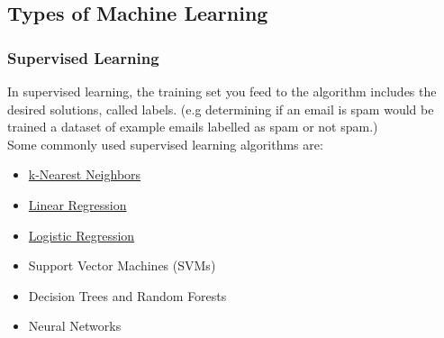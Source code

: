 \documentclass[12pt]{article}
\begin{document}
    \subsection{Types of Machine Learning}
        \subsubsection{Supervised Learning}
            In supervised learning, the training set you feed to the algorithm includes the desired solutions, called
            labels. (e.g determining if an email is spam would be trained a dataset of example emails labelled as spam or
            not spam.) \\[0.1in] 
            Some commonly used supervised learning algorithms are:
            \begin{itemize}
                \item \hyperref[sec:KNN]{k-Nearest Neighbors}
                \item \hyperref[sec:LinearRegression]{Linear Regression}
                \item \hyperref[sec:LogisticRegression]{Logistic Regression}
                \item Support Vector Machines (SVMs)
                \item Decision Trees and Random Forests
                \item Neural Networks
            \end{itemize}
        
\end{document}
